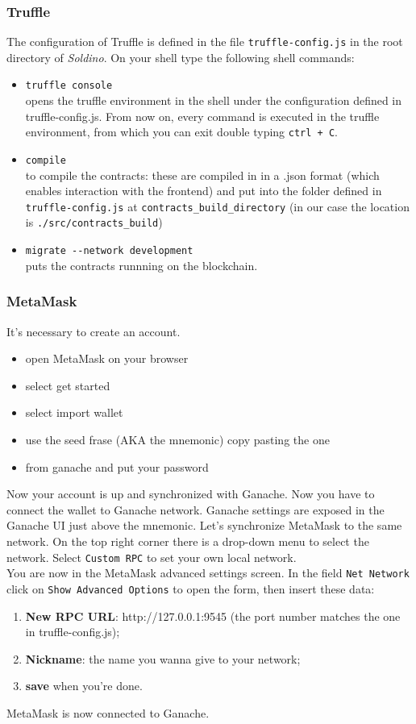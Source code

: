 \subsubsection{Truffle}
The configuration of Truffle is defined in the file \texttt{truffle-config.js} in the root directory of \textit{Soldino}.
On your shell type the following shell commands:
\begin{itemize}
	\item \texttt{truffle console}\\
	opens the truffle environment in the shell under the configuration defined in truffle-config.js. From now on, every command is executed in the truffle environment, from which you can exit double typing \texttt{ctrl + C}.
	\item \texttt{compile}\\
	to compile the contracts: these are compiled in in a .json format (which enables interaction with the frontend) and put into the folder defined in \texttt{truffle-config.js} at \texttt{contracts\_build\_directory} (in our case the location is \texttt{./src/contracts\_build})
	\item \texttt{migrate -{}-network development}\\
	puts the contracts runnning on the blockchain. 
\end{itemize}

\subsubsection{MetaMask}
It's necessary to create an account.
\begin{itemize}
	\item open MetaMask on your browser
	\item select get started
	\item select import wallet
	\item use the seed frase (AKA the mnemonic) copy pasting the one \item from ganache and put your password
\end{itemize}
Now your account is up and synchronized with Ganache.
Now you have to connect the wallet to Ganache network. Ganache settings are exposed in the Ganache UI just above the mnemonic.
Let's synchronize MetaMask to the same network. On the top right corner there is a drop-down menu to select the network. Select \texttt{Custom RPC} to set your own local network.\\
You are now in the MetaMask advanced settings screen. In the field \texttt{Net Network} click on \texttt{Show Advanced Options} to open the form, then insert these data:
\begin{enumerate}
	\item \textbf{New RPC URL}: http://127.0.0.1:9545 (the port number matches the one in truffle-config.js);
	\item \textbf{Nickname}: the name you wanna give to your network;
	\item \textbf{save} when you're done.
\end{enumerate}
MetaMask is now connected to Ganache.\\

